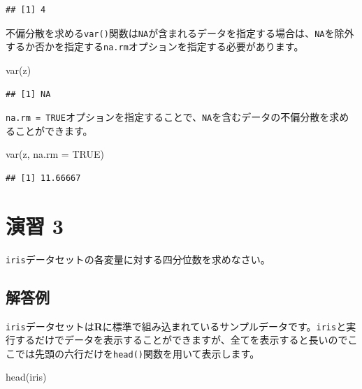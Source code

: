 \documentclass[
  12pt,
]{book}
\newenvironment{Shaded}{\begin{snugshade}}{\end{snugshade}}
\newcommand{\AttributeTok}[1]{\textcolor[rgb]{0.77,0.63,0.00}{#1}}
\newcommand{\ConstantTok}[1]{\textcolor[rgb]{0.00,0.00,0.00}{#1}}
\newcommand{\FunctionTok}[1]{\textcolor[rgb]{0.00,0.00,0.00}{#1}}
\newcommand{\NormalTok}[1]{#1}
\begin{document}
\begin{verbatim}
## [1] 4
\end{verbatim}

不偏分散を求める\texttt{var()}関数は\texttt{NA}が含まれるデータを指定する場合は、\texttt{NA}を除外するか否かを指定する\texttt{na.rm}オプションを指定する必要があります。

\begin{Shaded}
\begin{Highlighting}[numbers=left,,]
\FunctionTok{var}\NormalTok{(z)}
\end{Highlighting}
\end{Shaded}

\begin{verbatim}
## [1] NA
\end{verbatim}

\texttt{na.rm\ =\ TRUE}オプションを指定することで、\texttt{NA}を含むデータの不偏分散を求めることができます。

\begin{Shaded}
\begin{Highlighting}[numbers=left,,]
\FunctionTok{var}\NormalTok{(z, }\AttributeTok{na.rm =} \ConstantTok{TRUE}\NormalTok{)}
\end{Highlighting}
\end{Shaded}

\begin{verbatim}
## [1] 11.66667
\end{verbatim}

\hypertarget{ux6f14ux7fd2-3-1}{%
\section*{演習 3}\label{ux6f14ux7fd2-3-1}}

\texttt{iris}データセットの各変量に対する四分位数を求めなさい。

\hypertarget{ux89e3ux7b54ux4f8b-2}{%
\subsection*{解答例}\label{ux89e3ux7b54ux4f8b-2}}

\texttt{iris}データセットは\textbf{R}に標準で組み込まれているサンプルデータです。\texttt{iris}と実行するだけでデータを表示することができますが、全てを表示すると長いのでここでは先頭の六行だけを\texttt{head()}関数を用いて表示します。

\begin{Shaded}
\begin{Highlighting}[numbers=left,,]
\FunctionTok{head}\NormalTok{(iris)}
\end{Highlighting}
\end{Shaded}
\end{document}
